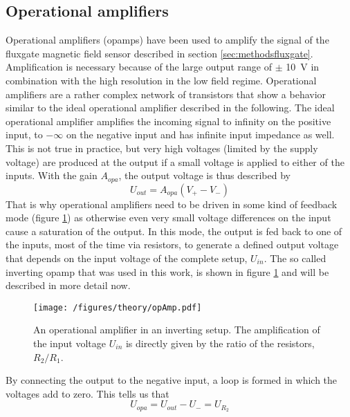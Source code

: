             \subsection{Operational amplifiers}
            Operational amplifiers (opamps) have been used to amplify the signal of the fluxgate magnetic field sensor described in section \ref{sec:methodsfluxgate}. Amplification is necessary because of the large output range of $\pm$ \SI{10}{\volt} in combination with the high resolution in the low field regime. Operational amplifiers are a rather complex network of transistors that show a behavior similar to the ideal operational amplifier described in the following. The ideal operational amplifier amplifies the incoming signal to infinity on the positive input, to $-\infty$ on the negative input and has infinite input impedance as well. This is not true in practice, but very high voltages (limited by the supply voltage) are produced at the output if a small voltage is applied to either of the inputs. With the gain $A_{opa}$, the output voltage is thus described by
                \begin{equation}
                        \label{equation:theory:OPAvoltage}
                    U_{out} = A_{opa}(V_+ - V_-)
                \end{equation}
                That is why operational amplifiers need to be driven in some kind of feedback mode (figure \ref{figure:theory:opAmp}) as otherwise even very small voltage differences on the input cause a saturation of the output. In this mode, the output is fed back to one of the inputs, most of the time via resistors, to generate a defined output voltage that depends on the input voltage of the complete setup, $U_{in}$. The so called inverting opamp that was used in this work, is shown in figure \ref{figure:theory:opAmp} and will be described in more detail now.
                \begin{figure}
                    \texttt{[image: /figures/theory/opAmp.pdf]}
                    \caption[Operational amplifier]{An operational amplifier in an inverting setup. The amplification of the input voltage $U_{in}$ is directly given by the ratio of the resistors, $R_2/R_1$.}
                    \label{figure:theory:opAmp}
                \end{figure}
                By connecting the output to the negative input, a loop is formed in which the voltages add to zero. This tells us that
                \begin{equation*}
                    U_{opa} = U_{out} - U_- = U_{R_2}
                \end{equation*}
